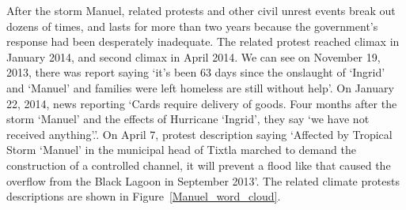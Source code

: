 \documentclass[9pt,twocolumn,twoside]{pnas-new}
\begin{document}
After the storm Manuel, related protests and other civil unrest events break out dozens of times, and lasts for more than two years because the government's response had been desperately inadequate. The related protest reached  climax in January 2014, and second climax in April 2014. We can see on November 19, 2013, there was report saying `it's been 63 days since the onslaught of `Ingrid' and `Manuel' and families were left homeless are still without help'. On January 22, 2014, news reporting `Cards require delivery of goods. Four months after the storm `Manuel' and the effects of Hurricane `Ingrid', they say `we have not received anything'.'. On April 7, protest description saying `Affected by Tropical Storm `Manuel' in the municipal head of Tixtla marched to demand the construction of a controlled channel, it will prevent a flood like that caused the overflow from the Black Lagoon in September 2013'. The related climate protests descriptions are shown in Figure~\ref{Manuel_word_cloud}.

\end{document}
